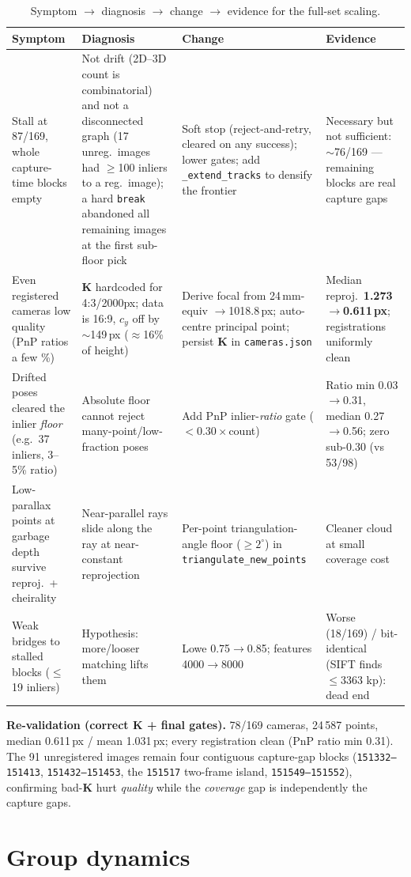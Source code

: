 \documentclass{article} %
\begin{document}
\begin{table}[h]
\centering
\small
\caption{Symptom $\to$ diagnosis $\to$ change $\to$ evidence for the full-set scaling.}
\begin{tabular}{p{2.4cm}p{3.4cm}p{3.0cm}p{3.2cm}}
\toprule
Symptom & Diagnosis & Change & Evidence \\
\midrule
Stall at 87/169, whole capture-time blocks empty &
Not drift (2D--3D count is combinatorial) and not a disconnected graph (17 unreg.\ images had $\ge$100 inliers to a reg.\ image); a hard \texttt{break} abandoned all remaining images at the first sub-floor pick &
Soft stop (reject-and-retry, cleared on any success); lower gates; add \texttt{\_extend\_tracks} to densify the frontier &
Necessary but not sufficient: $\sim$76/169 --- remaining blocks are real capture gaps \\
\addlinespace
Even registered cameras low quality (PnP ratios a few \%) &
$\mathbf{K}$ hardcoded for 4:3/2000px; data is 16:9, $c_y$ off by $\sim$149\,px ($\approx$16\% of height) &
Derive focal from 24\,mm-equiv $\to$1018.8\,px; auto-centre principal point; persist $\mathbf{K}$ in \texttt{cameras.json} &
Median reproj.\ \textbf{1.273$\to$0.611\,px}; registrations uniformly clean \\
\addlinespace
Drifted poses cleared the inlier \emph{floor} (e.g.\ 37 inliers, 3--5\% ratio) &
Absolute floor cannot reject many-point/low-fraction poses &
Add PnP inlier-\emph{ratio} gate ($<0.30\times$count) &
Ratio min 0.03$\to$0.31, median 0.27$\to$0.56; zero sub-0.30 (vs 53/98) \\
\addlinespace
Low-parallax points at garbage depth survive reproj.\ + cheirality &
Near-parallel rays slide along the ray at near-constant reprojection &
Per-point triangulation-angle floor ($\ge 2^\circ$) in \texttt{triangulate\_new\_points} &
Cleaner cloud at small coverage cost \\
\addlinespace
Weak bridges to stalled blocks ($\le$19 inliers) &
Hypothesis: more/looser matching lifts them &
Lowe 0.75$\to$0.85; features 4000$\to$8000 &
Worse (18/169) / bit-identical (SIFT finds $\le$3363 kp): dead end \\
\bottomrule
\end{tabular}
\end{table}

\noindent\textbf{Re-validation (correct $\mathbf{K}$ + final gates).} 78/169
cameras, 24\,587 points, median 0.611\,px / mean 1.031\,px; every registration
clean (PnP ratio min 0.31). The 91 unregistered images remain four contiguous
capture-gap blocks (\texttt{151332--151413}, \texttt{151432--151453}, the
\texttt{151517} two-frame island, \texttt{151549--151552}), confirming bad-$\mathbf{K}$
hurt \emph{quality} while the \emph{coverage} gap is independently the capture gaps.

\section{Group dynamics}
\end{document}
